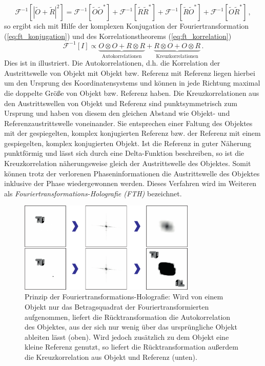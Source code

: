 \begin{equation}
	\mathscr{F}^{-1}\left[\left|\tilde{O}+\tilde{R}\right|^2\right]=
	\mathscr{F}^{-1}\left[\tilde{O}\tilde{O}^*\right]+
	\mathscr{F}^{-1}\left[\tilde{R}\tilde{R}^*\right]+
	\mathscr{F}^{-1}\left[\tilde{R}\tilde{O}^*\right]+
	\mathscr{F}^{-1}\left[\tilde{O}\tilde{R}^*\right]\,,
\end{equation}
so ergibt sich mit Hilfe der komplexen Konjugation der Fouriertransformation (\ref{eq:ft_konjugation}) und des Korrelationstheorems (\ref{eq:ft_korrelation})
\begin{equation}
	\mathscr{F}^{-1}[I]\propto \underbrace{O \otimes O + R\otimes R}_{\text{Autokorrelationen}}+\underbrace{R\otimes O+ O\otimes R}_{\text {Kreuzkorrelationen}}\,.
\end{equation}
Dies ist in  illustriert. Die Autokorrelationen, d.h. die Korrelation der Austrittswelle von Objekt mit Objekt bzw. Referenz mit Referenz liegen hierbei um den Ursprung des Koordinatensystems und können in jede Richtung maximal die doppelte Größe von Objekt bzw. Referenz haben. Die Kreuzkorrelationen aus den Austrittswellen von Objekt und Referenz sind punktsymmetrisch zum Ursprung und haben von diesem den gleichen Abstand wie Objekt- und Referenzaustrittswelle voneinander.
Sie  entsprechen einer Faltung des Objektes mit der gespiegelten, komplex konjugierten Referenz bzw. der Referenz mit einem gespiegelten, komplex konjugierten Objekt. Ist die Referenz in guter Näherung punktförmig und lässt sich durch eine Delta-Funktion beschreiben, so ist die Kreuzkorrelation näherungsweise gleich der Austrittswelle des Objektes. Somit können trotz der verlorenen Phaseninformationen die Austrittswelle des Objektes inklusive der Phase wiedergewonnen werden. Dieses Verfahren wird im Weiteren als \textit{Fouriertransformations-Holografie (FTH)} bezeichnet.

\begin{figure}
	\centering
	\includegraphics[width=0.75\textwidth]{images/fth.pdf}
	\caption[Prinzip Fouriertransformations-Holografie]{Prinzip der Fouriertransformations-Holografie: Wird von einem Objekt nur das Betragsquadrat der Fouriertransformierten aufgenommen, liefert die Rücktransformation die Autokorrelation des Objektes, aus der sich nur wenig über das ursprüngliche Objekt ableiten lässt (oben). Wird jedoch zusätzlich zu dem Objekt eine kleine Referenz genutzt, so liefert die Rücktransformation außerdem die Kreuzkorrelation aus Objekt und Referenz (unten).}
	\label{fig:fth}
\end{figure}

